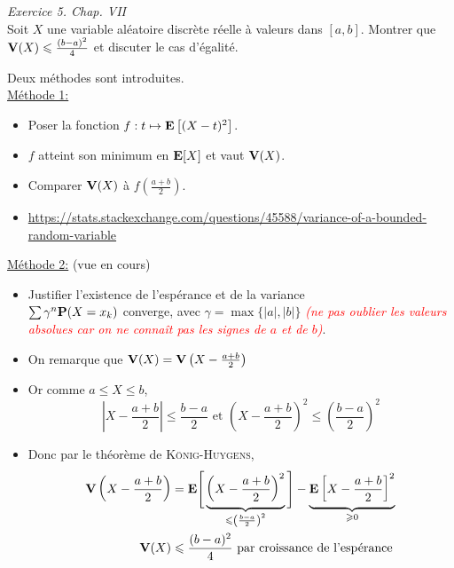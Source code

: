 \begin{exercice}    
    \emph{Exercice 5. Chap. VII}\\
    Soit $X$ une variable aléatoire discrète réelle à valeurs dans $[a, b]$. Montrer que $\V(X) \leqslant \frac{(b-a)^2}{4}$ et discuter le cas d'égalité.
\end{exercice}

\begin{solution}
    Deux méthodes sont introduites.\\
    \underline{Méthode 1:}
    \begin{itemize}
        \item Poser la fonction $f:t \mapsto \E \left[(X-t)^2 \right]$.
        \item $f$ atteint son minimum en $\E[X]$ et vaut $\V(X)$. 
        \item Comparer $\V(X)$ à $f \left( \frac{a + b}{2} \right)$.
        \item \url{https://stats.stackexchange.com/questions/45588/variance-of-a-bounded-random-variable}
    \end{itemize}
    
    \underline{Méthode 2:} (vue en cours)
    \begin{itemize}
        \item Justifier l'existence de l'espérance et de la variance\\
        $\sum \gamma^n \P(X=x_k)$ converge, avec $\boxed{\gamma = \max \{ |a|, |b| \}}$ \textcolor{red}{\emph{(ne pas oublier les valeurs absolues  car on ne connaît pas les signes de $a$ et de $b$)}}.
        \item On remarque que $\V(X) = \V \left( X - \frac{a+b}{2} \right)$
        \item Or comme $a \leqslant X \leqslant b$, $$\displaystyle \left| X - \frac{a+b}{2}\right| \leqslant \frac{b-a}{2} \text{ et } \displaystyle \left( X - \frac{a+b}{2} \right)^2 \leqslant \left(\frac{b-a}{2}\right)^2$$
        \item Donc par le théorème de \textsc{König-Huygens}, 
        \begin{align*}
            \V \left(X - \frac{a+b}{2} \right) &= \E \Bigg[ \underbrace{\left(X - \frac{a+b}{2} \right)^2}_{\leqslant \left( \frac{b-a}{2} \right)^2} \Bigg] - \underbrace{\E \left[X-\frac{a+b}{2} \right]^2}_{\geqslant 0} \\
            \V(X) &\leqslant \frac{(b-a)^2}{4} \text{ par croissance de l'espérance}
        \end{align*}
    \end{itemize}
    

\end{solution}
